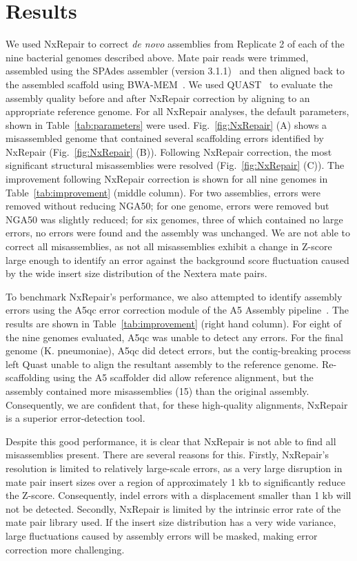 \section{Results}
We used NxRepair to correct \textit{de novo} assemblies from Replicate 2 of each of the nine bacterial genomes described above. Mate pair reads were trimmed, assembled using the SPAdes assembler (version 3.1.1)~\cite{Bankevich2012} and then aligned back to the assembled scaffold using BWA-MEM~\cite{li2013}. We used QUAST~\cite{gurevich2013} to evaluate the assembly quality before and after NxRepair correction by aligning to an appropriate reference genome. For all NxRepair analyses, the default parameters, shown in Table~\ref{tab:parameters} were used. Fig.~\ref{fig:NxRepair} (A) shows a misassembled genome that contained several scaffolding errors identified by NxRepair (Fig.~\ref{fig:NxRepair} (B)). Following NxRepair correction, the most significant structural misassemblies were resolved (Fig.~\ref{fig:NxRepair} (C)). The improvement following NxRepair correction is shown for all nine genomes in Table~\ref{tab:improvement} (middle column). For two assemblies, errors were removed without reducing NGA50; for one genome, errors were removed but NGA50 was slightly reduced; for six genomes, three of which contained no large errors, no errors were found and the assembly was unchanged. We are not able to correct all misassemblies, as not all misassemblies exhibit a change in Z-score large enough to identify an error against the background score fluctuation caused by the wide insert size distribution of the Nextera mate pairs. 

To benchmark NxRepair's performance, we also attempted to identify assembly errors using the A5qc error correction module of the A5 Assembly pipeline~\cite{tritt2012}. The results are shown in Table~\ref{tab:improvement} (right hand column). For eight of the nine genomes evaluated, A5qc was unable to detect any errors. For the final genome (K. pneumoniae), A5qc did detect errors, but the contig-breaking process left Quast unable to align the resultant assembly to the reference genome. Re-scaffolding using the A5 scaffolder did allow reference alignment, but the assembly contained more misassemblies (15) than the original assembly. Consequently, we are confident that, for these high-quality alignments, NxRepair is a superior error-detection tool. 

Despite this good performance, it is clear that NxRepair is not able to find all misassemblies present. There are several reasons for this. Firstly, NxRepair's resolution is limited to relatively large-scale errors, as a very large disruption in mate pair insert sizes over a region of approximately 1 kb to significantly reduce the Z-score. Consequently, indel errors with a displacement smaller than 1 kb will not be detected. Secondly, NxRepair is limited by the intrinsic error rate of the mate pair library used. If the insert size distribution has a very wide variance, large fluctuations caused by assembly errors will be masked, making error correction more challenging. 

